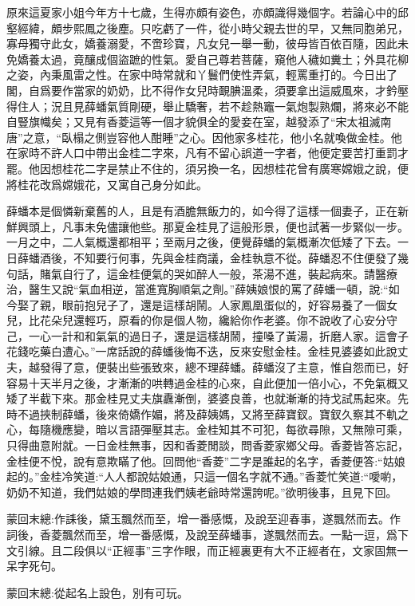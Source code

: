 \begin{parag}
    原來這夏家小姐今年方十七歲，生得亦頗有姿色，亦頗識得幾個字。若論心中的邱壑經緯，頗步熙鳳之後塵。只吃虧了一件，從小時父親去世的早，又無同胞弟兄，寡母獨守此女，嬌養溺愛，不啻珍寶，凡女兒一舉一動，彼母皆百依百隨，因此未免嬌養太過，竟釀成個盜蹠的性氣。愛自己尊若菩薩，窺他人穢如糞土；外具花柳之姿，內秉風雷之性。在家中時常就和丫鬟們使性弄氣，輕罵重打的。今日出了閣，自爲要作當家的奶奶，比不得作女兒時靦腆溫柔，須要拿出這威風來，才鈐壓得住人；況且見薛蟠氣質剛硬，舉止驕奢，若不趁熱竈一氣炮製熟爛，將來必不能自豎旗幟矣；又見有香菱這等一個才貌俱全的愛妾在室，越發添了“宋太祖滅南唐”之意，“臥榻之側豈容他人酣睡”之心。因他家多桂花，他小名就喚做金桂。他在家時不許人口中帶出金桂二字來，凡有不留心誤道一字者，他便定要苦打重罰才罷。他因想桂花二字是禁止不住的，須另換一名，因想桂花曾有廣寒嫦娥之說，便將桂花改爲嫦娥花，又寓自己身分如此。
\end{parag}


\begin{parag}
    薛蟠本是個憐新棄舊的人，且是有酒膽無飯力的，如今得了這樣一個妻子，正在新鮮興頭上，凡事未免儘讓他些。那夏金桂見了這般形景，便也試著一步緊似一步。一月之中，二人氣概還都相平；至兩月之後，便覺薛蟠的氣概漸次低矮了下去。一日薛蟠酒後，不知要行何事，先與金桂商議，金桂執意不從。薛蟠忍不住便發了幾句話，賭氣自行了，這金桂便氣的哭如醉人一般，茶湯不進，裝起病來。請醫療治，醫生又說“氣血相逆，當進寬胸順氣之劑。”薛姨娘恨的罵了薛蟠一頓，說:“如今娶了親，眼前抱兒子了，還是這樣胡鬧。人家鳳凰蛋似的，好容易養了一個女兒，比花朵兒還輕巧，原看的你是個人物，纔給你作老婆。你不說收了心安分守己，一心一計和和氣氣的過日子，還是這樣胡鬧，撞嗓了黃湯，折磨人家。這會子花錢吃藥白遭心。”一席話說的薛蟠後悔不迭，反來安慰金桂。金桂見婆婆如此說丈夫，越發得了意，便裝出些張致來，總不理薛蟠。薛蟠沒了主意，惟自怨而已，好容易十天半月之後，才漸漸的哄轉過金桂的心來，自此便加一倍小心，不免氣概又矮了半截下來。那金桂見丈夫旗纛漸倒，婆婆良善，也就漸漸的持戈試馬起來。先時不過挾制薛蟠，後來倚嬌作媚，將及薛姨媽，又將至薛寶釵。寶釵久察其不軌之心，每隨機應變，暗以言語彈壓其志。金桂知其不可犯，每欲尋隙，又無隙可乘，只得曲意附就。一日金桂無事，因和香菱閒談，問香菱家鄉父母。香菱皆答忘記，金桂便不悅，說有意欺瞞了他。回問他“香菱”二字是誰起的名字，香菱便答:“姑娘起的。”金桂冷笑道:“人人都說姑娘通，只這一個名字就不通。”香菱忙笑道:“噯喲，奶奶不知道，我們姑娘的學問連我們姨老爺時常還誇呢。”欲明後事，且見下回。
\end{parag}


\begin{parag}
    \begin{note}蒙回末總:作誄後，黛玉飄然而至，增一番感慨，及說至迎春事，遂飄然而去。作詞後，香菱飄然而至，增一番感慨，及說至薛蟠事，遂飄然而去。一點一逗，爲下文引線。且二段俱以“正經事”三字作眼，而正經裏更有大不正經者在，文家固無一呆字死句。\end{note}
\end{parag}


\begin{parag}
    \begin{note}蒙回末總:從起名上設色，別有可玩。\end{note}
\end{parag}

